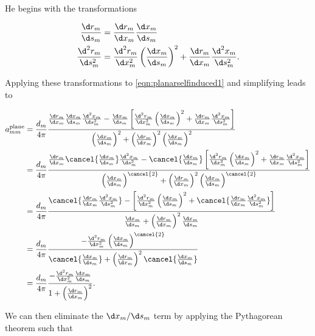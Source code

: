 He begins with the transformations

\begin{align}
	\frac{\d r_m}{\d s_m} &= \frac{\d r_m}{\d x_m}\frac{\d x_m}{\d s_m}\\
	\frac{\d^2 r_m}{\d s_m^2} &= \frac{\d^2 r_m}{\d x_m^2}\left(\frac{\d x_m}{\d s_m}\right)^2 + \frac{\d r_m}{\d x_m}\frac{\d^2 x_m}{\d s_m^2}.
\end{align}

Applying these transformations to \cref{eqn:planarselfinduced1} and simplifying leads to

\begin{align}
	a^\text{plane}_{mm} &= \frac{d_m}{4 \pi}
	\frac{
		\frac{\d r_m}{\d x_m}\frac{\d x_m}{\d s_m} \frac{\d^2 x_m}{\d s_m^2}
		-\frac{\d x_m}{\d s_m} \left[\frac{\d^2 r_m}{\d x_m^2}\left(\frac{\d x_m}{\d s_m}\right)^2
		+ \frac{\d r_m}{\d x_m}\frac{\d^2 x_m}{\d s_m^2} \right]
	}{
		\left(\frac{\d x_m}{\d s_m}\right)^2
		+ \left(\frac{\d r_m}{\d x_m}\right)^2\left(\frac{\d x_m}{\d s_m}\right)^2
	} \\
	&= \frac{d_m}{4 \pi}
	\frac{
		\frac{\d r_m}{\d x_m}\cancel{\frac{\d x_m}{\d s_m}} \frac{\d^2 x_m}{\d s_m^2}
		- \cancel{\frac{\d x_m}{\d s_m}}  \left[\frac{\d^2 r_m}{\d x_m^2}\left(\frac{\d x_m}{\d s_m}\right)^2
		+ \frac{\d r_m}{\d x_m}\frac{\d^2 x_m}{\d s_m^2} \right]
	}{
		\left(\frac{\d x_m}{\d s_m}\right)^{\cancel{2}}
		+ \left(\frac{\d r_m}{\d x_m}\right)^2\left(\frac{\d x_m}{\d s_m}\right)^{\cancel{2}}
	} \\
	&= \frac{d_m}{4 \pi}
	\frac{
		\cancel{\frac{\d r_m}{\d x_m} \frac{\d^2 x_m}{\d s_m^2}}
		-  \left[\frac{\d^2 r_m}{\d x_m^2}\left(\frac{\d x_m}{\d s_m}\right)^2
		+ \cancel{\frac{\d r_m}{\d x_m} \frac{\d^2 x_m}{\d s_m^2}} \right]
	}{
		\frac{\d x_m}{\d s_m}
		+ \left(\frac{\d r_m}{\d x_m}\right)^2 \frac{\d x_m}{\d s_m}
	} \\
	&= \frac{d_m}{4 \pi}
	\frac{
		- \frac{\d^2 r_m}{\d x_m^2}\left(\frac{\d x_m}{\d s_m}\right)^{\cancel{2}}
	}{
		\cancel{\frac{\d x_m}{\d s_m}}
		+ \left(\frac{\d r_m}{\d x_m}\right)^2\cancel{\frac{\d x_m}{\d s_m}}
	} \\
	\label{eqn:planarselfinduced2}
	&= \frac{d_m}{4 \pi}
	\frac{
		- \frac{\d^2 r_m}{\d x_m^2} \frac{\d x_m}{\d s_m}
	}{
		1 + \left(\frac{\d r_m}{\d x_m}\right)^2
	}.
\end{align}

\noindent We can then eliminate the \(\d x_m/ \d s_m\) term by applying the Pythagorean theorem such that

